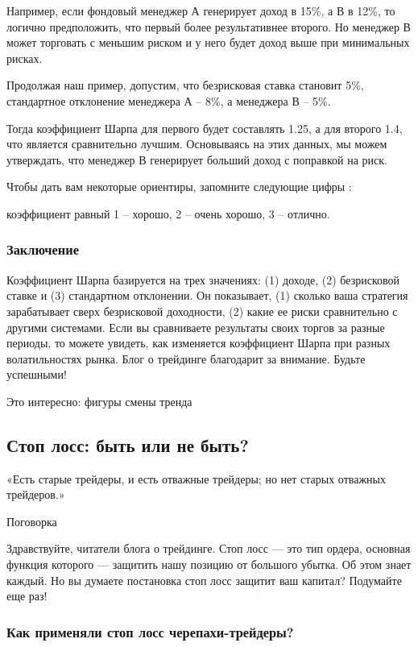 \documentclass[a5paper]{article}
\begin{document}
Например, если фондовый менеджер А генерирует доход в 15\%, а В в 12\%, то логично предположить, что первый более результативнее второго. Но менеджер В может торговать с меньшим риском и у него будет доход выше при минимальных рисках.

Продолжая наш пример, допустим, что безрисковая ставка становит 5\%, стандартное отклонение менеджера А – 8\%, а менеджера В – 5\%.

Тогда коэффициент Шарпа для первого будет составлять 1.25, а для второго 1.4, что является сравнительно лучшим. Основываясь на этих данных, мы можем утверждать, что менеджер В генерирует больший доход с поправкой на риск.

Чтобы дать вам некоторые ориентиры, запомните следующие цифры :

    коэффициент равный 1 – хорошо, 2 – очень хорошо, 3 – отлично.

\subsubsection{Заключение}

Коэффициент Шарпа базируется на трех значениях: (1) доходе, (2) безрисковой ставке и (3) стандартном отклонении. Он показывает, (1) сколько ваша стратегия зарабатывает сверх безрисковой доходности, (2) какие ее риски сравнительно с другими системами. Если вы сравниваете результаты своих торгов за разные периоды, то можете увидеть, как изменяется коэффициент Шарпа при разных волатильностях рынка. Блог о трейдинге благодарит за внимание. Будьте успешными!


Это интересно: фигуры смены тренда

\subsection{Стоп лосс: быть или не быть?}

«Есть старые трейдеры, и есть отважные трейдеры; но нет старых отважных трейдеров.»

Поговорка

Здравствуйте, читатели блога о трейдинге. Стоп лосс — это тип ордера,
основная функция которого — защитить нашу позицию от большого
убытка. Об этом знает каждый. Но вы думаете постановка стоп лосс
защитит ваш капитал? Подумайте еще раз!

\subsubsection{Как применяли стоп лосс черепахи-трейдеры?}
\end{document}
